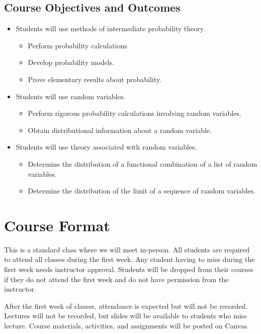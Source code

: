 \documentclass[11pt]{article}\usepackage[]{graphicx}\usepackage[]{xcolor}
\begin{document}
\subsection{Course Objectives and Outcomes}

\begin{itemize}
  \item Students will use methods of intermediate probability theory.
  \begin{itemize}
    \item Perform probability calculations.
    \item Develop probability models.
    \item Prove elementary results about probability.
  \end{itemize}
  \item Students will use random variables.
  \begin{itemize}
    \item Perform rigorous probability calculations involving random variables.
    \item Obtain distributional information about a random variable.
  \end{itemize}
  \item Students will use theory associated with random variables.
  \begin{itemize}
    \item Determine the distribution of a functional combination of a list of random variables.
    \item Determine the distribution of the limit of a sequence of random variables.
  \end{itemize}
\end{itemize}

\section{Course Format}

This is a standard class where we will meet in-person.
All students are required to attend all classes during the first week. 
Any student having to miss during the first week needs instructor approval. 
Students will be dropped from their courses if they do not attend the first week and do not have permission from the instructor.

After the first week of classes, attendance is expected but will not be recorded.
Lectures will not be recorded, but slides will be available to students who miss lecture.
Course materials, activities, and assignments will be posted on Canvas.
\end{document}
